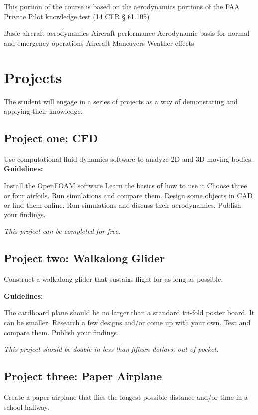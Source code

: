 \documentclass[12pt]{article}
\begin{document}
		This portion of the course is based on the aerodynamics portions of the FAA Private Pilot knowledge test (\href{https://www.law.cornell.edu/cfr/text/14/61.105}{14 CFR \S{} 61.105})
		\begin{outline}[enumerate]
			\1 Basic aircraft aerodynamics
			\1 Aircraft performance
			\1 Aerodynamic basis for normal and emergency operations 
			\1 Aircraft Maneuvers
			\1 Weather effects
		\end{outline}
	\section{Projects}
	The student will engage in a series of projects as a way of demonstating and applying their knowledge. 
		\subsection{Project one: CFD}
			Use computational fluid dynamics software to analyze 2D and 3D moving bodies. 
			\textbf{Guidelines:}
			\begin{outline}
				\1 Install the OpenFOAM software
				\1 Learn the basics of how to use it 
				\1 Choose three or four airfoils. Run simulations and compare them. 
				\1 Design some objects in CAD or find them online. Run simulations and discuss their aerodynamics. 
				\1 Publish your findings. 
			\end{outline}
			\textit{This project can be completed for free. }
		\subsection{Project two: Walkalong Glider}
			Construct a walkalong glider that sustains flight for as long as possible. 
			
			\textbf{Guidelines: }
			\begin{outline}
				\1 The cardboard plane should be no larger than a standard tri-fold poster board. It can be smaller. 
				\1 Research a few designs and/or come up with your own. Test and compare them. 
				\1 Publish your findings. 
			\end{outline}
			\textit{This project should be doable in less than fifteen dollars, out of pocket. }
		\subsection{Project three: Paper Airplane}
			Create a paper airplane that flies the longest possible distance and/or time in a school hallway. 
			
\end{document}
